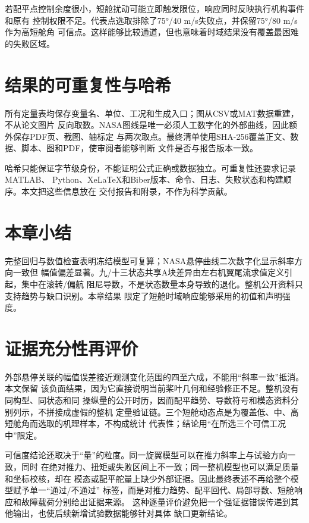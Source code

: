 \documentclass[UTF8,12pt,oneside,openany,fontset=windows]{ctexbook}
\begin{document}
若配平点控制余度很小，短舱扰动可能立即触发限位，响应同时反映执行机构事件和原有 控制权限不足。代表点选取排除了75°/40 m/s失败点，并保留75°/80 m/s作为高短舱角 可信点。这样能够比较通道，但也意味着时域结果没有覆盖最困难的失败区域。

\section{结果的可重复性与哈希}

所有定量表均保存变量名、单位、工况和生成入口；图从CSV或MAT数据重建，不从论文图片 反向取数。NASA图线是唯一必须人工数字化的外部曲线，因此额外保存PDF页、截图、轴标定 与两次取点。最终清单使用SHA-256覆盖正文、数据、脚本、图和PDF，使审阅者能够判断 文件是否与报告版本一致。

哈希只能保证字节级身份，不能证明公式正确或数据独立。可重复性还要求记录MATLAB、 Python、XeLaTeX和Biber版本、命令、日志、失败状态和构建顺序。本文把这些信息放在 交付报告和附录，不作为科学贡献。

\section{本章小结}

完整回归与数值检查表明冻结模型可复算；NASA悬停曲线二次数字化显示斜率方向一致但 幅值偏差显著。九/十三状态共享A块差异由左右机翼尾流求值定义引起，集中在滚转/偏航 阻尼导数，不是状态数量本身导致的退化。整机公开资料只支持趋势与缺口识别。本章结果 限定了短舱时域响应能够采用的初值和声明强度。

\section{证据充分性再评价}

外部悬停关联的幅值误差接近观测变化范围的四至六成，不能用“斜率一致”抵消。本文保留 该负面结果，因为它直接说明当前桨叶几何和经验修正不足。整机没有同构型、同状态和同 操纵量的公开时历，因而配平趋势、导数符号和模态资料分别列示，不拼接成虚假的整机 定量验证链。三个短舱动态点是为覆盖低、中、高短舱角而选取的机理样本，不构成统计 代表性；结论用“在所选三个可信工况中”限定。

可信度结论还取决于“量”的粒度。同一旋翼模型可以在推力斜率上与试验方向一致，同时 在绝对推力、扭矩或失败区间上不一致；同一整机模型也可以满足质量和坐标校核，却在 模态或配平舵量上缺少外部证据。因此最终表述不再给整个模型赋予单一“通过/不通过” 标签，而是对推力趋势、配平回代、局部导数、短舱响应和故障载荷分别给出证据来源。 这种逐量评价避免把一个强证据错误传递到其他输出，也使后续新增试验数据能够针对具体 缺口更新结论。
\end{document}

